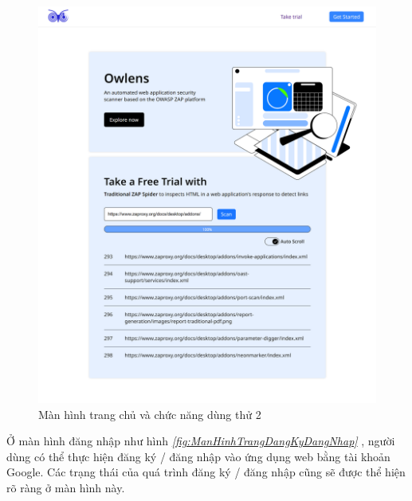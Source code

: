 \begin{figure}[H]
      \centering
      \includegraphics[width=\textwidth]{applied-thesis-chapters/chapter-6/Màn hình trang chủ và chức năng dùng thử 2.png}
      \caption{Màn hình trang chủ và chức năng dùng thử 2}
      \label{fig:ManHinhTrangChuVaChucNangDungThu2}
\end{figure}

\tab \tab Ở màn hình đăng nhập như hình \textit{\ref{fig:ManHinhTrangDangKyDangNhap} }, người dùng có thể thực hiện đăng ký / đăng nhập vào ứng dụng web bằng tài khoản Google.
Các trạng thái của quá trình đăng ký / đăng nhập cũng sẽ được thể hiện rõ ràng ở màn hình này.

